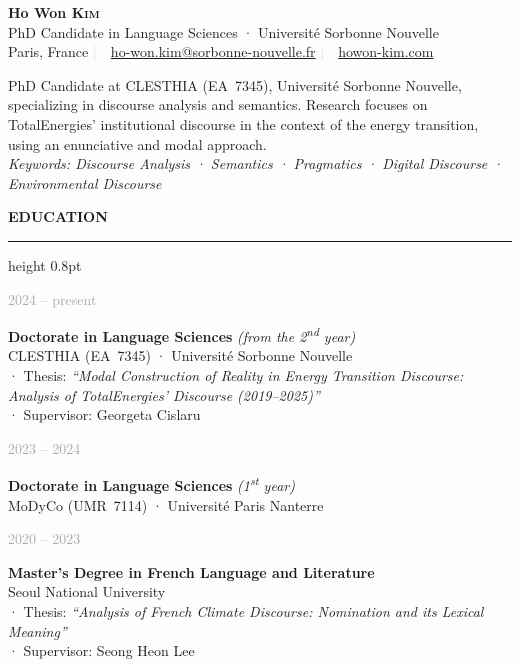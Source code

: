 \documentclass[10.5pt, a4paper]{article}
\newlength{\datecol}
\newlength{\contentcol}
\newcommand{\cvrow}[2]{%
  \noindent
  \parbox[t]{\datecol}{\raggedleft\textcolor{darkgray}{\small #1}}%
  \hspace{1.2em}%
  \parbox[t]{\contentcol}{\sloppy\hbadness=10000 #2}%
  \par\vspace{0.6em}%
}
\newcommand{\cvsection}[1]{%
  \vspace{10pt}%
  {\color{navy}\large\bfseries\MakeUppercase{#1}}%
  \vspace{2pt}%
  {\color{navy}\hrule height 0.8pt}%
  \vspace{6pt}%
}
\begin{document}

\begin{center}
  {\huge\bfseries\color{navy} Ho Won \textsc{Kim}}\\[10pt]
  {\large PhD Candidate in Language Sciences · Université Sorbonne Nouvelle}\\[6pt]
  {\small
    Paris, France
    \quad\textcolor{lightgray}{|}\ \
    \href{mailto:ho-won.kim@sorbonne-nouvelle.fr}{ho-won.kim@sorbonne-nouvelle.fr}
    \quad\textcolor{lightgray}{|}\ \
    \href{https://howon-kim.com}{howon-kim.com}
  }
\end{center}

\vspace{8pt}

{PhD Candidate at CLESTHIA (EA~7345), Université Sorbonne Nouvelle, specializing in discourse
analysis and semantics. Research focuses on TotalEnergies' institutional discourse in the context
of the energy transition, using an enunciative and modal approach.}
\vspace{4pt}
\\
{\small\itshape\color{darkgray}
Keywords: Discourse Analysis  ·  Semantics  ·  Pragmatics  ·  Digital Discourse  ·  Environmental Discourse}
\vspace{6pt}


\cvsection{Education}

\cvrow{2024 -- present}{%
  \textbf{Doctorate in Language Sciences}
  \textit{(from the 2\textsuperscript{nd} year)}\\
  CLESTHIA (EA~7345) · Université Sorbonne Nouvelle\\
  {\small   · Thesis: \textit{``Modal Construction of Reality in Energy Transition Discourse:
  Analysis of TotalEnergies' Discourse (2019--2025)''}\\
    · Supervisor: Georgeta Cislaru}}

\cvrow{2023 -- 2024}{%
  \textbf{Doctorate in Language Sciences}
  \textit{(1\textsuperscript{st} year)}\\
  MoDyCo (UMR~7114) · Université Paris Nanterre}

\cvrow{2020 -- 2023}{%
  \textbf{Master's Degree in French Language and Literature}\\
  Seoul National University\\
  {\small   · Thesis: \textit{``Analysis of French Climate Discourse:
  Nomination and its Lexical Meaning''}\\
   · Supervisor: Seong Heon Lee}}
\end{document}
